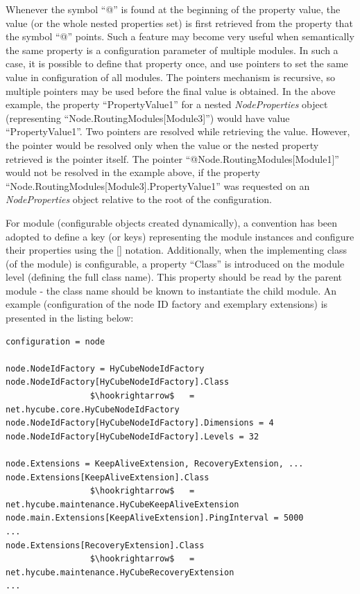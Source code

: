 \noindent
Whenever the symbol ``@'' is found at the beginning of the property value, the value (or the whole nested properties set) is first retrieved from the property that the symbol ``@'' points. Such a feature may become very useful when semantically the same property is a configuration parameter of multiple modules. In such a case, it is possible to define that property once, and use pointers to set the same value in configuration of all modules. The pointers mechanism is recursive, so multiple pointers may be used before the final value is obtained. In the above example, the property ``PropertyValue1'' for a nested \emph{NodeProperties} object (representing ``Node.RoutingModules[Module3]'') would have value ``PropertyValue1''. Two pointers are resolved while retrieving the value. However, the pointer would be resolved only when the value or the nested property retrieved is the pointer itself. The pointer ``@Node.RoutingModules[Module1]'' would not be resolved in the example above, if the property ``Node.RoutingModules[Module3].PropertyValue1'' was requested on an \emph{NodeProperties} object relative to the root of the configuration.

For module (configurable objects created dynamically), a convention has been adopted to define a key (or keys) representing the module instances and configure their properties using the [] notation. Additionally, when the implementing class (of the module) is configurable, a property ``Class'' is introduced on the module level (defining the full class name). This property should be read by the parent module - the class name should be known to instantiate the child module. An example (configuration of the node ID factory and exemplary extensions) is presented in the listing below:

\begin{lstlisting}[style=listing1noindent, mathescape]
configuration = node

node.NodeIdFactory = HyCubeNodeIdFactory
node.NodeIdFactory[HyCubeNodeIdFactory].Class 
                 $\hookrightarrow$   = net.hycube.core.HyCubeNodeIdFactory
node.NodeIdFactory[HyCubeNodeIdFactory].Dimensions = 4
node.NodeIdFactory[HyCubeNodeIdFactory].Levels = 32

node.Extensions = KeepAliveExtension, RecoveryExtension, ...
node.Extensions[KeepAliveExtension].Class 
                 $\hookrightarrow$   = net.hycube.maintenance.HyCubeKeepAliveExtension
node.main.Extensions[KeepAliveExtension].PingInterval = 5000
...
node.Extensions[RecoveryExtension].Class
                 $\hookrightarrow$   = net.hycube.maintenance.HyCubeRecoveryExtension
...
\end{lstlisting}



